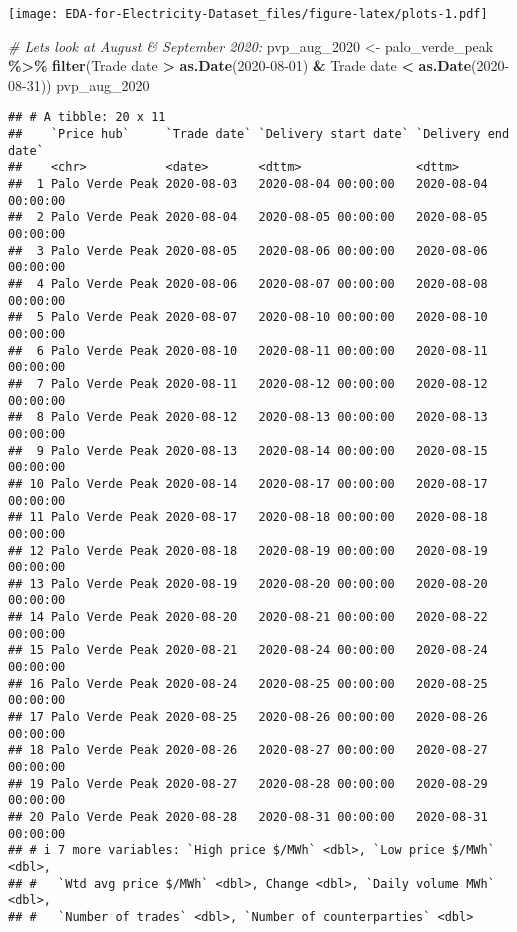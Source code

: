 \documentclass[
]{article}
\newenvironment{Shaded}{\begin{snugshade}}{\end{snugshade}}
\newcommand{\AttributeTok}[1]{\textcolor[rgb]{0.13,0.29,0.53}{#1}}
\newcommand{\CommentTok}[1]{\textcolor[rgb]{0.56,0.35,0.01}{\textit{#1}}}
\newcommand{\FunctionTok}[1]{\textcolor[rgb]{0.13,0.29,0.53}{\textbf{#1}}}
\newcommand{\NormalTok}[1]{#1}
\newcommand{\OtherTok}[1]{\textcolor[rgb]{0.56,0.35,0.01}{#1}}
\newcommand{\SpecialCharTok}[1]{\textcolor[rgb]{0.81,0.36,0.00}{\textbf{#1}}}
\newcommand{\StringTok}[1]{\textcolor[rgb]{0.31,0.60,0.02}{#1}}
\begin{document}
\texttt{[image: EDA-for-Electricity-Dataset\_files/figure-latex/plots-1.pdf]}

\begin{Shaded}
\begin{Highlighting}[]
\CommentTok{\# Let\textquotesingle{}s look at August \& September 2020:}
\NormalTok{pvp\_aug\_2020 }\OtherTok{\textless{}{-}}\NormalTok{ palo\_verde\_peak }\SpecialCharTok{\%\textgreater{}\%}
  \FunctionTok{filter}\NormalTok{(}\StringTok{\textasciigrave{}}\AttributeTok{Trade date}\StringTok{\textasciigrave{}} \SpecialCharTok{\textgreater{}} \FunctionTok{as.Date}\NormalTok{(}\StringTok{\textquotesingle{}2020{-}08{-}01\textquotesingle{}}\NormalTok{) }\SpecialCharTok{\&} \StringTok{\textasciigrave{}}\AttributeTok{Trade date}\StringTok{\textasciigrave{}} \SpecialCharTok{\textless{}} \FunctionTok{as.Date}\NormalTok{(}\StringTok{\textquotesingle{}2020{-}08{-}31\textquotesingle{}}\NormalTok{))}
\NormalTok{pvp\_aug\_2020}
\end{Highlighting}
\end{Shaded}

\begin{verbatim}
## # A tibble: 20 x 11
##    `Price hub`     `Trade date` `Delivery start date` `Delivery end date`
##    <chr>           <date>       <dttm>                <dttm>             
##  1 Palo Verde Peak 2020-08-03   2020-08-04 00:00:00   2020-08-04 00:00:00
##  2 Palo Verde Peak 2020-08-04   2020-08-05 00:00:00   2020-08-05 00:00:00
##  3 Palo Verde Peak 2020-08-05   2020-08-06 00:00:00   2020-08-06 00:00:00
##  4 Palo Verde Peak 2020-08-06   2020-08-07 00:00:00   2020-08-08 00:00:00
##  5 Palo Verde Peak 2020-08-07   2020-08-10 00:00:00   2020-08-10 00:00:00
##  6 Palo Verde Peak 2020-08-10   2020-08-11 00:00:00   2020-08-11 00:00:00
##  7 Palo Verde Peak 2020-08-11   2020-08-12 00:00:00   2020-08-12 00:00:00
##  8 Palo Verde Peak 2020-08-12   2020-08-13 00:00:00   2020-08-13 00:00:00
##  9 Palo Verde Peak 2020-08-13   2020-08-14 00:00:00   2020-08-15 00:00:00
## 10 Palo Verde Peak 2020-08-14   2020-08-17 00:00:00   2020-08-17 00:00:00
## 11 Palo Verde Peak 2020-08-17   2020-08-18 00:00:00   2020-08-18 00:00:00
## 12 Palo Verde Peak 2020-08-18   2020-08-19 00:00:00   2020-08-19 00:00:00
## 13 Palo Verde Peak 2020-08-19   2020-08-20 00:00:00   2020-08-20 00:00:00
## 14 Palo Verde Peak 2020-08-20   2020-08-21 00:00:00   2020-08-22 00:00:00
## 15 Palo Verde Peak 2020-08-21   2020-08-24 00:00:00   2020-08-24 00:00:00
## 16 Palo Verde Peak 2020-08-24   2020-08-25 00:00:00   2020-08-25 00:00:00
## 17 Palo Verde Peak 2020-08-25   2020-08-26 00:00:00   2020-08-26 00:00:00
## 18 Palo Verde Peak 2020-08-26   2020-08-27 00:00:00   2020-08-27 00:00:00
## 19 Palo Verde Peak 2020-08-27   2020-08-28 00:00:00   2020-08-29 00:00:00
## 20 Palo Verde Peak 2020-08-28   2020-08-31 00:00:00   2020-08-31 00:00:00
## # i 7 more variables: `High price $/MWh` <dbl>, `Low price $/MWh` <dbl>,
## #   `Wtd avg price $/MWh` <dbl>, Change <dbl>, `Daily volume MWh` <dbl>,
## #   `Number of trades` <dbl>, `Number of counterparties` <dbl>
\end{verbatim}
\end{document}
